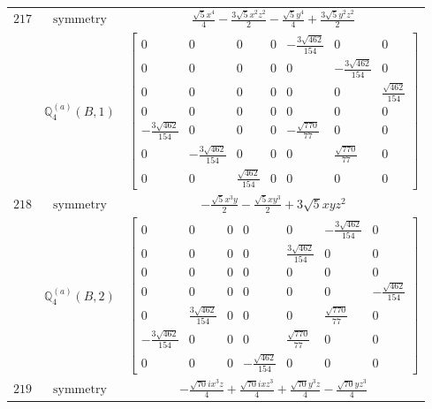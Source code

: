 \documentclass[fleqn,8pt,landscape]{jsarticle}
\begin{document}
\begin{longtable}{ccc}
$ 217 $ & $ \text{symmetry} $ & $ \frac{\sqrt{5} x^{4}}{4} - \frac{3 \sqrt{5} x^{2} z^{2}}{2} - \frac{\sqrt{5} y^{4}}{4} + \frac{3 \sqrt{5} y^{2} z^{2}}{2} $ \\
$  $ & $ \mathbb{Q}_{4}^{(a)}(B,1) $ & $ \begin{bmatrix} 0 & 0 & 0 & 0 & - \frac{3 \sqrt{462}}{154} & 0 & 0 \\ 0 & 0 & 0 & 0 & 0 & - \frac{3 \sqrt{462}}{154} & 0 \\ 0 & 0 & 0 & 0 & 0 & 0 & \frac{\sqrt{462}}{154} \\ 0 & 0 & 0 & 0 & 0 & 0 & 0 \\ - \frac{3 \sqrt{462}}{154} & 0 & 0 & 0 & - \frac{\sqrt{770}}{77} & 0 & 0 \\ 0 & - \frac{3 \sqrt{462}}{154} & 0 & 0 & 0 & \frac{\sqrt{770}}{77} & 0 \\ 0 & 0 & \frac{\sqrt{462}}{154} & 0 & 0 & 0 & 0 \end{bmatrix} $ \\ \hline
$ 218 $ & $ \text{symmetry} $ & $ - \frac{\sqrt{5} x^{3} y}{2} - \frac{\sqrt{5} x y^{3}}{2} + 3 \sqrt{5} x y z^{2} $ \\
$  $ & $ \mathbb{Q}_{4}^{(a)}(B,2) $ & $ \begin{bmatrix} 0 & 0 & 0 & 0 & 0 & - \frac{3 \sqrt{462}}{154} & 0 \\ 0 & 0 & 0 & 0 & \frac{3 \sqrt{462}}{154} & 0 & 0 \\ 0 & 0 & 0 & 0 & 0 & 0 & 0 \\ 0 & 0 & 0 & 0 & 0 & 0 & - \frac{\sqrt{462}}{154} \\ 0 & \frac{3 \sqrt{462}}{154} & 0 & 0 & 0 & \frac{\sqrt{770}}{77} & 0 \\ - \frac{3 \sqrt{462}}{154} & 0 & 0 & 0 & \frac{\sqrt{770}}{77} & 0 & 0 \\ 0 & 0 & 0 & - \frac{\sqrt{462}}{154} & 0 & 0 & 0 \end{bmatrix} $ \\ \hline
$ 219 $ & $ \text{symmetry} $ & $ - \frac{\sqrt{70} i x^{3} z}{4} + \frac{\sqrt{70} i x z^{3}}{4} + \frac{\sqrt{70} y^{3} z}{4} - \frac{\sqrt{70} y z^{3}}{4} $ \\

\end{longtable}
\end{document}
